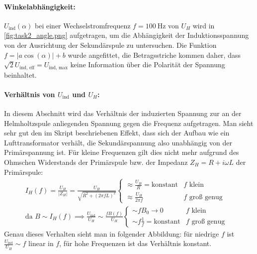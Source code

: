 \paragraph{Winkelabhängigkeit:} \(U_\text{ind}(\alpha)\) bei einer Wechselstromfrequenz \(f=\qty{100}{\hertz}\) von \(U_H\) wird in \cref{fig:task2_angle.png} aufgetragen, um die Abhängigkeit der Induktionsspannung von der Ausrichtung der Sekundärspule zu untersuchen. Die Funktion \(f=|a \cos(\alpha)|+b\)  wurde angefittet, die Betragsstriche kommen daher, dass \(\sqrt{2}U_\text{ind, eff}=U_\text{ind, max}\) keine Information über die Polarität der Spannung beinhaltet.
\FloatBarrier

\paragraph{Verhältnis von \(U_\text{ind}\) und \(U_H\):} 
In diesem Abschnitt wird das Verhältnis der induzierten Spannung zur an der Helmholtzspule anliegenden Spannung gegen die Frequenz aufgetragen. Man sieht sehr gut den im Skript beschriebenen Effekt, dass sich der Aufbau wie ein Lufttransformator verhält, die Sekundärspannung also unabhängig von der Primärspannung ist. Für kleine Frequenzen gilt dies nicht mehr aufgrund des Ohmschen Widerstands der Primärspule bzw. der Impedanz \(Z_H=R+i\omega L\) der Primärspule: 
\begin{align}
    I_H(f)=\frac{U_H}{|Z_H|}=\frac{U_H}{\sqrt{R^2+(2 \pi f L)^2}}\begin{cases}
    \approx\frac{U_H}{R}=\text{konstant} & f \text{ klein} \\
    \approx\frac{U_H}{2\pi f} & f \text{ groß genug}
\end{cases}&\\
\text{da }B\sim I_H(f) \implies \frac{U_\text{ind}}{U_H}\sim\frac{fB(f)}{U_H}\begin{cases}
    \sim f B_0 \to 0& f \text{ klein}\\
    \sim f \frac{1}{f}=\text{konstant} & f\text{ groß genug}
\end{cases}&
\end{align}
Genau dieses Verhalten sieht man in folgender Abbildung: für niedrige \(f\) ist \(\frac{U_\text{ind}}{U_H}\sim f\) linear in \(f\), für hohe Frequenzen ist das Verhältnis konstant. 


